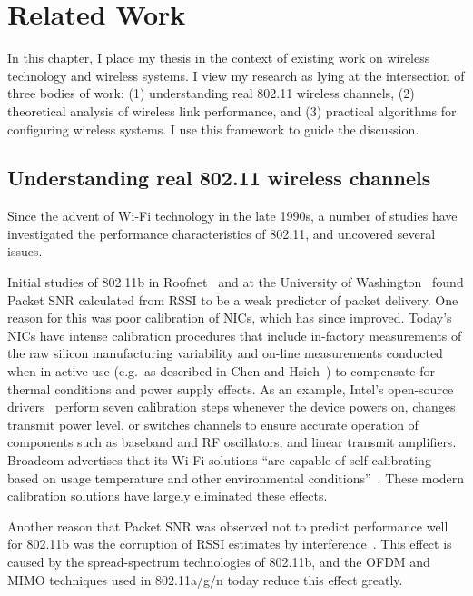\ifx\mainfile\undefined

\setcounter{chapter}{8} %
\fi

\cleardoublepage
\chapter{Related Work}
\label{chap:related}

In this chapter, I place my thesis in the context of existing work on wireless technology and wireless systems. I view my research as lying at the intersection of three bodies of work: (1) understanding real 802.11 wireless channels, (2) theoretical analysis of wireless link performance, and (3) practical algorithms for configuring wireless systems. I use this framework to guide the discussion.

\section{Understanding real 802.11 wireless channels}
Since the advent of Wi-Fi technology in the late 1990s, a number of studies have investigated the performance characteristics of 802.11, and uncovered several issues.

Initial studies of 802.11b in Roofnet~\cite{Aguayo_Roofnet} and at the University of Washington~\cite{Reis_interference} found Packet SNR calculated from RSSI to be a weak predictor of packet delivery. One reason for this was poor calibration of NICs, which has since improved. Today's NICs have intense calibration procedures that include in-factory measurements of the raw silicon manufacturing variability and on-line measurements conducted when in active use (e.g.\ as described in Chen and Hsieh~\cite{Chen_IQcalib}) to compensate for thermal conditions and power supply effects. As an example, Intel's open-source drivers~\cite{iwlwifi} perform seven calibration steps whenever the device powers on, changes transmit power level, or switches channels to ensure accurate operation of components such as baseband and RF oscillators, and linear transmit amplifiers. Broadcom advertises that its Wi-Fi solutions ``are capable of self-calibrating based on usage temperature and other environmental conditions''~\cite{Broadcom_calib}. These modern calibration solutions have largely eliminated these effects.

Another reason that Packet SNR was observed not to predict performance well for 802.11b was the corruption of RSSI estimates by interference~\cite{Reis_interference,Vlavianos_metrics}. This effect is caused by the spread-spectrum technologies of 802.11b, and the OFDM and MIMO techniques used in 802.11a/g/n today reduce this effect greatly.

